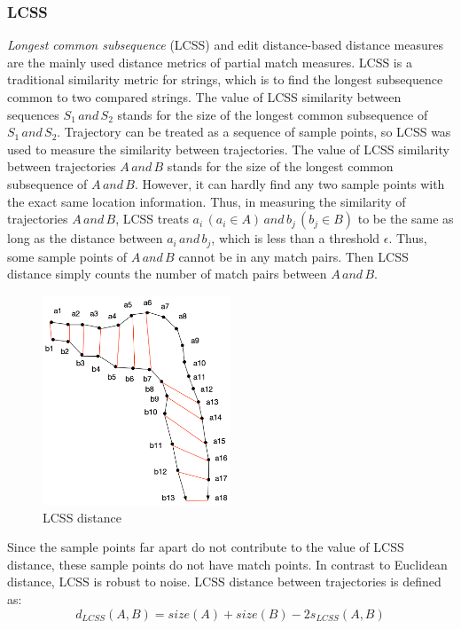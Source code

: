 \documentclass[a4paper, 12pt]{article}
\newcommand{\myequations}[1]{
   \addcontentsline{equ}{myequations}{\protect\numberline{\theequation}#1}
}
\begin{document}
\subsubsection{LCSS}
\textit{Longest common subsequence} (LCSS) and edit distance-based distance measures are the mainly used distance metrics of partial match measures. LCSS is a traditional similarity metric for strings, which is to find the longest subsequence common to two compared strings. The value of LCSS similarity between sequences $S_{1}\,and\,S_{2}$ stands for the size of the longest common subsequence of $S_{1}\,and\,S_{2}$. Trajectory can be treated as a sequence of sample points, so LCSS was used to measure the similarity between trajectories. The value of LCSS similarity between trajectories $A\,and\,B$ stands for the size of the longest common subsequence of $A\,and\,B$. However, it can hardly find any two sample points with the exact same location information. Thus, in measuring the similarity of trajectories $A\,and\,B$, LCSS treats $a_{i}\,(a_{i} \in A)\,and\,b_{j}\,(b_{j} \in B)$ to be the same as long as the distance between $a_{i}\,and\,b_{j}$, which is less than a threshold $\epsilon$. Thus, some sample points of $A\,and\,B$ cannot be in any match pairs. Then LCSS distance simply counts the number of match pairs between $A\,and\,B$. 

\begin{figure}[ht]
    \centering
    \includegraphics[width=0.5\textwidth]{LCSS.png}
    \caption{LCSS distance}
\end{figure}

Since the sample points far apart do not contribute to the value of LCSS distance, these sample points do not have match points. In contrast to Euclidean distance, LCSS is robust to noise. LCSS distance between trajectories is defined as:
\begin{equation} \label{eq3}
    d_{LCSS}(A, B) = size(A) + size(B) - 2s_{LCSS}(A,B)
\end{equation}
\myequations{LCSS distance}
\end{document}
